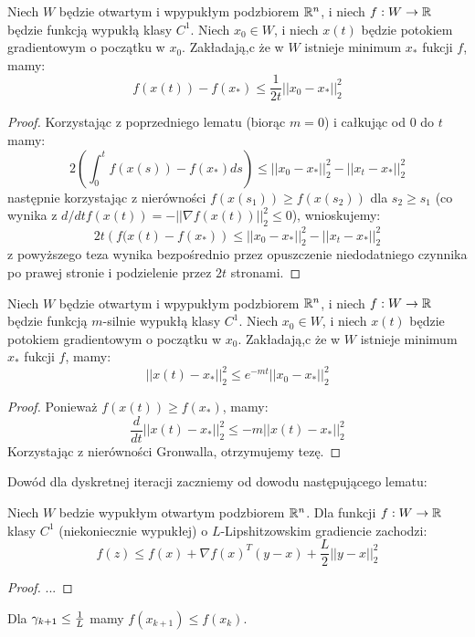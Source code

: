 \documentclass[10pt,a4paper,draft]{report}
\begin{document}
\begin{lemma}
Niech $W$ będzie otwartym i wpypukłym podzbiorem $\mathbb{R}^n$, i niech $f : W \rightarrow \mathbb{R}$ będzie funkcją wypukłą klasy $C^1$. Niech $x_0 \in W$, i niech $x(t)$ będzie potokiem gradientowym o początku w $x_0$. Zakładają,c że w $W$ istnieje minimum $x_*$ fukcji $f$, mamy:
\[
f(x(t)) - f(x_*) \leq \frac{1}{2t}||x_0 - x_*||_2^2
\]
\end{lemma}
\begin{proof}
Korzystając z poprzedniego lematu (biorąc $m=0$) i całkując od $0$ do $t$ mamy:
\[
2 \left( \int_0^t f(x(s)) - f(x_*) ds \right) \leq ||x_0 - x_*||_2^2 - ||x_t - x_*||_2^2  
\]
następnie korzystając z nierówności $f(x(s_1)) \geq f(x(s_2))$ dla $s_2 \geq s_1$ (co wynika z $d/dt f(x(t)) = - ||\nabla f(x(t))||_2^2 \leq 0$), wnioskujemy:
\[
2t \left( f(x(t) - f(x_*) \right) \leq ||x_0 - x_*||_2^2 - ||x_t - x_*||_2^2  
\]
z powyższego teza wynika bezpośrednio przez opuszczenie niedodatniego czynnika po prawej stronie i podzielenie przez $2t$ stronami.
\end{proof}
\begin{lemma}
Niech $W$ będzie otwartym i wpypukłym podzbiorem $\mathbb{R}^n$, i niech $f : W \rightarrow \mathbb{R}$ będzie funkcją $m$-silnie wypukłą klasy $C^1$. Niech $x_0 \in W$, i niech $x(t)$ będzie potokiem gradientowym o początku w $x_0$. Zakładają,c że w $W$ istnieje minimum $x_*$ fukcji $f$, mamy:
\[
||x(t) - x_*||_2^2 \leq e^{-mt} ||x_0 - x_*||_2^2
\]
\end{lemma}
\begin{proof}
Ponieważ $f(x(t)) \geq f(x_*)$, mamy:
\[
\frac{d}{dt} ||x(t) - x_*||_2^2 \leq - m||x(t) - x_*||_2^2
\]
Korzystając z nierówności Gronwalla, otrzymujemy tezę.
\end{proof}

Dowód dla dyskretnej iteracji zaczniemy od dowodu następującego lematu:
\begin{lemma}
Niech $W$ bedzie wypukłym otwartym podzbiorem $\mathbb{R}^n$. Dla funkcji $f : W \rightarrow \mathbb{R}$ klasy $C^1$ (niekoniecznie wypukłej) o $L$-Lipshitzowskim gradiencie zachodzi:
\[
f(z) \leq f(x) + \nabla f(x)^T (y - x) + \frac{L}{2}||y - x||_2^2
\]
\end{lemma}
\begin{proof}
...
\end{proof}
\begin{corollary}
Dla $\gamma_{k+1} \leq \frac{1}{L}$ mamy $f(x_{k+1}) \leq f(x_k)$.
\end{corollary}
\end{document}
